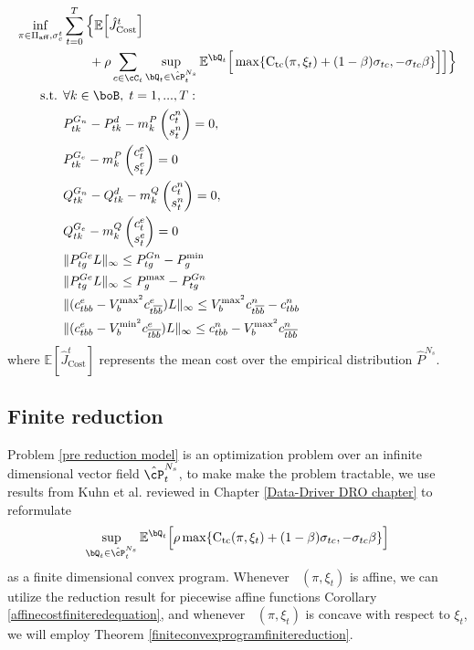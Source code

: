 \documentclass[11pt,a4paper,oneside,openany]{book}
\DeclareMathOperator{\C}{C_{tc}}
\numberwithin{definition}{section}
\numberwithin{theorem}{section}
\numberwithin{problem}{section}
\begin{document}
\begin{align}
\label{pre reduction model}
\inf_{\pi \in \Pi_{\text{aff}}, \sigma_c^t} & \sum_{t=0}^T \Big\{ \mathbb{E}\Big[\hat J^t_{\text{Cost}}\Big] \nonumber \\
& \qquad + \rho  \sum_{c \in \cC_t} \sup_{\bQ_t \in \hat \cP^{N_s}_t}\mathbb{E}^{\bQ_t}\Big[\max\{\C(\pi,\xi_t)+(1-\beta)\sigma_{tc}, -\sigma_{tc}\beta\}\Big]\Big]\Big\} \\
\text{s.t. } & \forall k \in \boB,\;  t = 1,...,T:  \nonumber \\
& P^{G_n}_{tk} - P_{tk}^d - m_k^P \begin{pmatrix} c_t^n \\ s_t^n \end{pmatrix} = 0, \\
  &  P_{tk}^{G_e}-m_k^P  \begin{pmatrix} c_t^e \\ s_t^e \end{pmatrix} = 0 \\
 & Q^{G_n}_{tk} - Q_{tk}^d - m_k^Q \begin{pmatrix} c_t^n \\ s_t^n \end{pmatrix} = 0, \\
&Q_{tk}^{G_e}-m_k^Q  \begin{pmatrix} c_t^e \\ s_t^e \end{pmatrix} = 0 \\
&\|P_{tg}^{Ge}L\|_{\infty} \leq P_{tg}^{Gn}-P_g^{\text{min}} \\
&\|P_{tg}^{Ge}L\|_{\infty} \leq P_g^{\text{max}}-P_{tg}^{Gn} \\
&\|(c^e_{tbb}-V_b^{\text{max}^2}c^e_{t\overline{bb}})L\|_{\infty} \leq V_b^{\text{max}^2}c^n_{t\overline{bb}} - c^n_{tbb} \\
&\|(c^e_{tbb}-V_b^{\text{min}^2}c^e_{\overline{tbb}})L\|_{\infty} \leq  c^n_{tbb} - V_b^{\text{max}^2}c^n_{\overline{tbb}} 
\end{align}
where $\mathbb{E}[\hat J^t_{\text{Cost}}]$ represents the mean cost over the empirical distribution $\hat P^{N_s}$.

\subsection{Finite reduction}
Problem \ref{pre reduction model} is an optimization problem over an infinite dimensional vector field \(\hat \cP_t^{N_s}\), to make make the problem tractable,  we use results from Kuhn et al. \cite{distibRobWasserstein} reviewed in Chapter \ref{Data-Driver DRO chapter} to reformulate
 \begin{equation}
 \label{distrib robust cost constraint}
     \sup_{\bQ_t \in \hat \cP^{N_s}_t}\mathbb{E}^{\bQ_t}\Big[\rho\max \{\C(\pi,\xi_t)+(1-\beta)\sigma_{tc}, -\sigma_{tc}\beta\}\Big]
 \end{equation}
 as a finite dimensional convex program. Whenever $\C(\pi, \xi_t)$ is affine, we can utilize the reduction result for piecewise affine functions Corollary \ref{affinecostfiniteredequation}, and whenever $\C(\pi, \xi_t)$ is concave with respect to $\xi_t$, we will employ Theorem \ref{finiteconvexprogramfinitereduction}.
 
\end{document}
